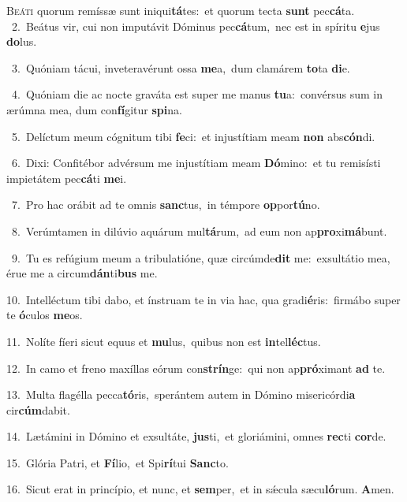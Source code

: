 \lettrine{\initial\textcolor{\initialcolor}{B}}{eáti} quorum remíssæ sunt iniqui\-\textbf{tá}\-tes:~\star et quorum tecta \textbf{sunt} pec\-\textbf{cá}\-ta.\\
{\numbfont\textcolor{\numbcolor}{~2.}}~Beátus vir, cui non imputávit Dóminus pec\-\textbf{cá}\-tum,~\star nec est in spíritu \textbf{e}\-jus \textbf{do}\-lus.\par
{\numbfont\textcolor{\numbcolor}{~3.}}~Quóniam tácui, inveteravérunt ossa \textbf{me}\-a,~\star dum clamárem \textbf{to}\-ta \textbf{di}\-e.\par
{\numbfont\textcolor{\numbcolor}{~4.}}~Quóniam die ac nocte graváta est super me manus \textbf{tu}\-a:~\star convérsus sum in ærúmna mea, dum con\-\textbf{fí}\-gitur \textbf{spi}\-na.\par
{\numbfont\textcolor{\numbcolor}{~5.}}~Delíctum meum cógnitum tibi \textbf{fe}\-ci:~\star et injustítiam meam \textbf{non} abs\-\textbf{cón}\-di.\par
{\numbfont\textcolor{\numbcolor}{~6.}}~Dixi: Confitébor advérsum me injustítiam meam \textbf{Dó}\-mino:~\star et tu remisísti impietátem pec\-\textbf{cá}\-ti \textbf{me}\-i.\par
{\numbfont\textcolor{\numbcolor}{~7.}}~Pro hac orábit ad te omnis \textbf{sanc}\-tus,~\star in témpore \textbf{op}\-por\-\textbf{tú}\-no.\par
{\numbfont\textcolor{\numbcolor}{~8.}}~Verúmtamen in dilúvio aquárum mul\-\textbf{tá}\-rum,~\star ad eum non ap\-\textbf{pro}\-xi\-\textbf{má}\-bunt.\par
{\numbfont\textcolor{\numbcolor}{~9.}}~Tu es refúgium meum a tribulatióne, quæ circúmde\textbf{dit} me:~\star exsultátio mea, érue me a circum\-\textbf{dán}\-ti\textbf{bus} me.\par
{\numbfont\textcolor{\numbcolor}{10.}}~Intelléctum tibi dabo, et ínstruam te in via hac, qua gradi\-\textbf{é}\-ris:~\star firmábo super te \textbf{ó}\-culos \textbf{me}\-os.\par
{\numbfont\textcolor{\numbcolor}{11.}}~Nolíte fíeri sicut equus et \textbf{mu}\-lus,~\star quibus non est \textbf{in}\-tel\-\textbf{léc}\-tus.\par
{\numbfont\textcolor{\numbcolor}{12.}}~In camo et freno maxíllas eórum con\-\textbf{strín}\-ge:~\star qui non ap\-\textbf{pró}\-ximant \textbf{ad} te.\par
{\numbfont\textcolor{\numbcolor}{13.}}~Multa flagélla pecca\-\textbf{tó}\-ris,~\star sperántem autem in Dómino misericórdi\textbf{a} cir\-\textbf{cúm}\-dabit.\par
{\numbfont\textcolor{\numbcolor}{14.}}~Lætámini in Dómino et exsultáte, \textbf{jus}\-ti,~\star et gloriámini, omnes \textbf{rec}\-ti \textbf{cor}\-de.\par
{\numbfont\textcolor{\numbcolor}{15.}}~Glória Patri, et \textbf{Fí}\-lio,~\star et Spi\-\textbf{rí}\-tui \textbf{Sanc}\-to.\par
{\numbfont\textcolor{\numbcolor}{16.}}~Sicut erat in princípio, et nunc, et \textbf{sem}\-per,~\star et in sǽcula sæcu\-\textbf{ló}\-rum. \textbf{A}\-men.\par
